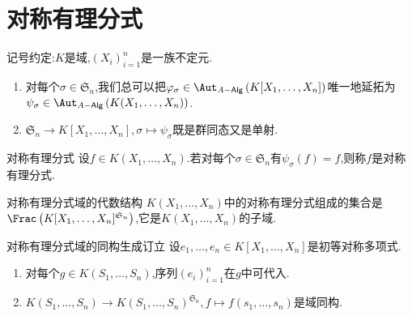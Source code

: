 \section{对称有理分式}

记号约定:$K$是域,$\left(X_{i}\right)_{i=1}^{n}$是一族不定元.

\begin{proposition}{}{}
	\begin{enumerate}
		\item 对每个$\sigma\in\mathfrak{S}_{n}$,我们总可以把$\varphi_{\sigma}\in\Aut_{A-\mathsf{Alg}}\left(K[X_{1},\ldots,X_{n}]\right)$唯一地延拓为$\psi_{\sigma}\in\Aut_{A-\mathsf{Alg}}\left(K(X_{1},\ldots,X_{n})\right)$.
		\item $\mathfrak{S}_{n}\to K[X_{1},\ldots,X_{n}],\sigma\mapsto\psi_{\sigma}$既是群同态又是单射.
	\end{enumerate}
\end{proposition}

\begin{definition}{对称有理分式}{}
	设$f\in K\left(X_{1},\ldots,X_{n}\right)$.若对每个$\sigma\in\mathfrak{S}_{n}$有$\psi_{\sigma}\left(f\right)=f$,则称$f$是对称有理分式.
\end{definition}

\begin{proposition}{对称有理分式域的代数结构}{}
	$K(X_{1},\ldots,X_{n})$中的对称有理分式组成的集合是$\Frac\left(K[X_{1},\ldots,X_{n}]^{\mathfrak{S}_{n}}\right)$,它是$K(X_{1},\ldots,X_{n})$的子域.
\end{proposition}

\begin{corollary}{对称有理分式域的同构生成订立}{}
	设$e_{1},\ldots,e_{n}\in K[X_{1},\ldots,X_{n}]$是初等对称多项式.
	\begin{enumerate}
		\item 对每个$g\in K(S_{1},\ldots,S_{n})$,序列$\left(e_{i}\right)_{i=1}^{n}$在$g$中可代入.
		\item $K(S_{1},\ldots,S_{n})\to K(S_{1},\ldots,S_{n})^{\mathfrak{S}_{n}},f\mapsto f\left(s_{1},\ldots,s_{n}\right)$是域同构.
	\end{enumerate}
\end{corollary}





































